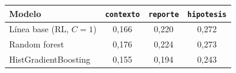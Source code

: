 \begin{tabular}{@{}lccc@{}}
\toprule
Modelo & \texttt{contexto} & \texttt{reporte} & \texttt{hipotesis} \\
\midrule
Línea base (RL, $C{=}1$) & 0,166 & 0,220 & 0,272 \\
Random forest & 0,176 & 0,224 & 0,273 \\
HistGradientBoosting & 0,155 & 0,194 & 0,243 \\
\bottomrule
\end{tabular}
